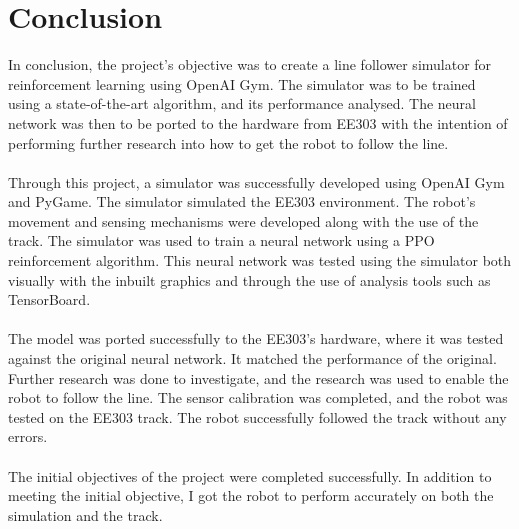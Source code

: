 \documentclass[a4paper,12pt]{article}
\begin{document}
\section{Conclusion}
In conclusion, the project's objective was to create a line follower simulator for reinforcement learning using OpenAI Gym. The simulator was to be trained using a state-of-the-art algorithm, and its performance analysed. The neural network was then to be ported to the hardware from EE303 with the intention of performing further research into how to get the robot to follow the line. 
\\\\
Through this project, a simulator was successfully developed using OpenAI Gym and PyGame. The simulator simulated the EE303 environment. The robot's movement and sensing mechanisms were developed along with the use of the track. The simulator was used to train a neural network using a PPO reinforcement algorithm. This neural network was tested using the simulator both visually with the inbuilt graphics and through the use of analysis tools such as TensorBoard. 
\\\\
The model was ported successfully to the EE303's hardware, where it was tested against the original neural network. It matched the performance of the original. Further research was done to investigate, and the research was used to enable the robot to follow the line. The sensor calibration was completed, and the robot was tested on the EE303 track. The robot successfully followed the track without any errors. 
\\\\
The initial objectives of the project were completed successfully. In addition to meeting the initial objective, I got the robot to perform accurately on both the simulation and the track.
\end{document}
